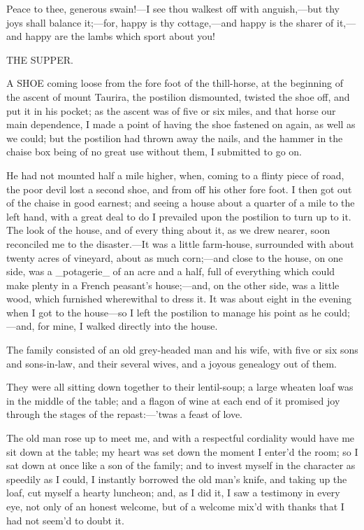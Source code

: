 \documentclass[twoside]{article}
\begin{document}
Peace to thee, generous swain!—I see thou walkest off with anguish,—but
thy joys shall balance it;—for, happy is thy cottage,—and happy is the
sharer of it,—and happy are the lambs which sport about you!




THE SUPPER.


A SHOE coming loose from the fore foot of the thill-horse, at the
beginning of the ascent of mount Taurira, the postilion dismounted,
twisted the shoe off, and put it in his pocket; as the ascent was of five
or six miles, and that horse our main dependence, I made a point of
having the shoe fastened on again, as well as we could; but the postilion
had thrown away the nails, and the hammer in the chaise box being of no
great use without them, I submitted to go on.

He had not mounted half a mile higher, when, coming to a flinty piece of
road, the poor devil lost a second shoe, and from off his other fore
foot.  I then got out of the chaise in good earnest; and seeing a house
about a quarter of a mile to the left hand, with a great deal to do I
prevailed upon the postilion to turn up to it.  The look of the house,
and of every thing about it, as we drew nearer, soon reconciled me to the
disaster.—It was a little farm-house, surrounded with about twenty acres
of vineyard, about as much corn;—and close to the house, on one side, was
a _potagerie_ of an acre and a half, full of everything which could make
plenty in a French peasant’s house;—and, on the other side, was a little
wood, which furnished wherewithal to dress it.  It was about eight in the
evening when I got to the house—so I left the postilion to manage his
point as he could;—and, for mine, I walked directly into the house.

The family consisted of an old grey-headed man and his wife, with five or
six sons and sons-in-law, and their several wives, and a joyous genealogy
out of them.

They were all sitting down together to their lentil-soup; a large wheaten
loaf was in the middle of the table; and a flagon of wine at each end of
it promised joy through the stages of the repast:—’twas a feast of love.

The old man rose up to meet me, and with a respectful cordiality would
have me sit down at the table; my heart was set down the moment I enter’d
the room; so I sat down at once like a son of the family; and to invest
myself in the character as speedily as I could, I instantly borrowed the
old man’s knife, and taking up the loaf, cut myself a hearty luncheon;
and, as I did it, I saw a testimony in every eye, not only of an honest
welcome, but of a welcome mix’d with thanks that I had not seem’d to
doubt it.
\end{document}
